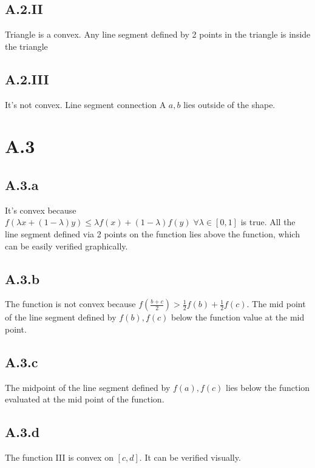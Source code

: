 \documentclass[]{article}
\begin{document}
    \subsection*{A.2.II}
        Triangle is a convex. Any line segment defined by 2 points in the triangle is inside the triangle
    \subsection*{A.2.III}
        It's not convex. Line segment connection A $a, b$ lies outside of the shape. 

\section*{A.3}
    \subsection*{A.3.a}    
        It's convex because $f(\lambda x + (1 - \lambda)y)\le \lambda f(x) + (1 - \lambda)f(y) \;\forall \lambda\in [0, 1]$ is true. All the line segment defined via 2 points on the function lies above the function, which can be easily verified graphically. 
    \subsection*{A.3.b}
        The function is not convex because $f(\frac{b + c}{2}) > \frac{1}{2}f(b) + \frac{1}{2}f(c)$. The mid point of the line segment defined by $f(b), f(c)$ below the function value at the mid point. 
    \subsection*{A.3.c}
        The midpoint of the line segment defined by $f(a), f(c)$ lies below the function evaluated at the mid point of the function. 
    \subsection*{A.3.d}
        The function III is convex on $[c,d]$. It can be verified visually.
\end{document}
